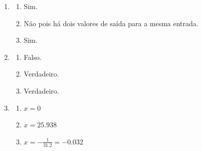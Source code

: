 \documentclass[11pt]{article}
\begin{document}
\begin{enumerate}
	\item
	\begin{enumerate}
		\item Sim.
		\item Não pois há dois valores de saída para a mesma entrada.
		\item Sim.
	\end{enumerate}

	\item
	\begin{enumerate}
		\item Falso.
		\item Verdadeiro.
		\item Verdadeiro.
	\end{enumerate}

	\item 
	\begin{enumerate}
		\item $x = 0$
		\item $x = 25.938$
		\item $x = -\frac{1}{31.2} = -0.032$
	\end{enumerate}
\end{enumerate} 
\end{document}
